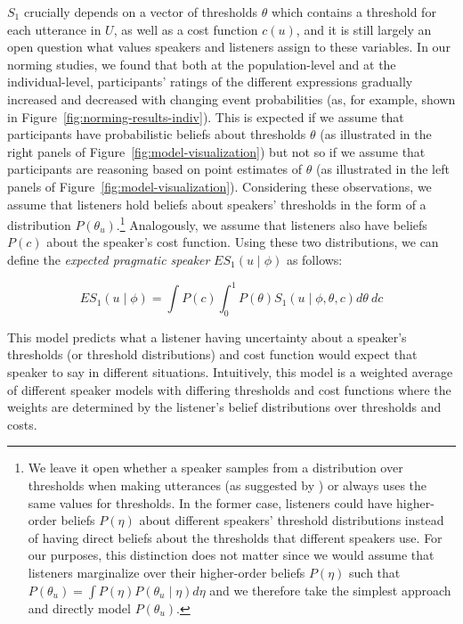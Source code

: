 \documentclass[lucida,biblatex]{sp} %
\begin{document}
$S_1$ crucially depends on a vector of thresholds $\theta$ which contains a threshold for each utterance in $U$, 
as well as  a cost function $c(u)$, and it is still largely an open question what values speakers and listeners assign 
to these variables. In our norming studies, we found that both at the population-level and at the individual-level, 
participants' ratings of the different expressions gradually increased and decreased with changing event probabilities 
(as, for example, shown in Figure~\ref{fig:norming-results-indiv}). This is expected if we assume that participants
have probabilistic beliefs about thresholds $\theta$ (as illustrated in the right panels of Figure~\ref{fig:model-visualization}) but not so if we assume that
participants are reasoning based on point estimates of $\theta$ (as illustrated in the left panels of Figure~\ref{fig:model-visualization}).
Considering these observations,  we assume that listeners hold beliefs about speakers' thresholds  in the form of a distribution $P\left(\theta_u\right)$.\footnote{We leave it open 
whether a speaker samples from a distribution over thresholds when making utterances (as suggested by \citet{Qing2015}) 
or always uses the same values for thresholds. In the former case, listeners could have higher-order beliefs  $P(\eta)$ 
about different speakers' threshold distributions instead of having direct beliefs about the thresholds that different 
speakers use. For our purposes, this distinction does not matter since we would assume that listeners marginalize over their higher-order beliefs $P(\eta)$ such that  $P\left(\theta_u\right) = \int P\left(\eta\right) P\left(\theta_u \mid \eta\right) d\eta$ and we therefore take the simplest approach and directly model $P\left(\theta_u\right)$. } Analogously, we assume that listeners also have beliefs $P(c)$ about the speaker's cost function.
Using these two distributions, we can define the \textit{expected pragmatic speaker} $ES_1\left(u \mid \phi \right)$ as follows:

$$ES_1\left(u \mid \phi \right) = \int P(c) \int_0^1 P(\theta) S_1\left(u \mid \phi, \theta, c\right) d\theta \  d c$$

This model predicts what a listener having uncertainty about a speaker's thresholds (or threshold distributions) and cost function would expect that speaker to say in different situations.
Intuitively, this model is a weighted average of different speaker models with differing thresholds and cost functions where the weights are determined by the listener's belief distributions over thresholds
and costs. 
\end{document}
